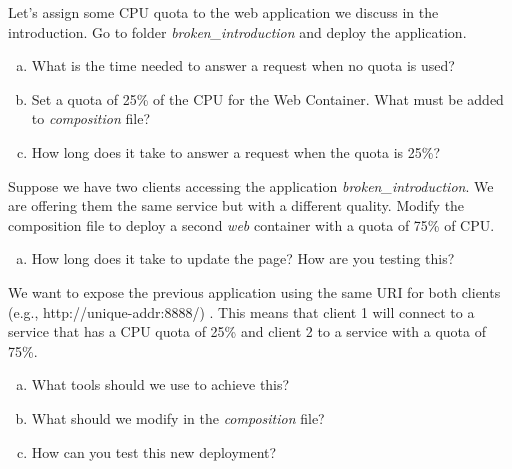 \documentclass[a4paper,11pt]{exam}
\begin{document}
\begin{questions}
	\question Let's assign some CPU quota to the web application we discuss in the introduction. Go to folder \textit{broken\_introduction} and deploy the application.
	
	\begin{enumerate}[(a)] %
		\item What is the time needed to answer a request when no quota is used?
		\item Set a quota of 25\% of the CPU for the Web Container. What must be added to \textit{composition} file? 
		\item How long does it take to answer a request when the quota is 25\%?
	\end{enumerate}
	
	\question Suppose we have two clients accessing the application \textit{broken\_introduction}. We are offering them the same service but with a different quality. Modify the composition file to deploy a second \textit{web} container with a quota of 75\% of CPU.
	
	\begin{enumerate}[(a)] %
	 	\item How long does it take to update the page? How are you testing this?
	\end{enumerate}
	
	\question We want to expose the previous application using the same URI for both clients (e.g., http://unique-addr:8888/) . This means that client 1 will connect to a service that has a CPU quota of 25\% and client 2 to a service with a quota of 75\%.
	 
	\begin{enumerate}[(a)] %
		\item What tools should we use to achieve this?
		\item What should we modify in the \textit{composition} file?
		\item How can you test this new deployment?
	\end{enumerate}
	
\end{questions}
\end{document}
